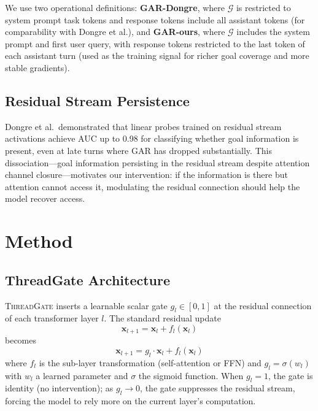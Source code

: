 \documentclass[11pt,a4paper]{article}
\newcommand{\gar}{\textsc{GAR}}
\newcommand{\tg}{\textsc{ThreadGate}}
\begin{document}
We use two operational definitions: \textbf{GAR-Dongre}, where $\mathcal{G}$ is restricted to system prompt task tokens and response tokens include all assistant tokens (for comparability with Dongre et al.), and \textbf{GAR-ours}, where $\mathcal{G}$ includes the system prompt and first user query, with response tokens restricted to the last token of each assistant turn (used as the training signal for richer goal coverage and more stable gradients).

\subsection{Residual Stream Persistence}

Dongre et al.\ demonstrated that linear probes trained on residual stream activations achieve AUC up to 0.98 for classifying whether goal information is present, even at late turns where \gar{} has dropped substantially.
This dissociation---goal information persisting in the residual stream despite attention channel closure---motivates our intervention: if the information is there but attention cannot access it, modulating the residual connection should help the model recover access.

\section{Method}
\label{sec:method}

\subsection{ThreadGate Architecture}

\tg{} inserts a learnable scalar gate $g_l \in [0, 1]$ at the residual connection of each transformer layer $l$.
The standard residual update
\begin{equation}
    \mathbf{x}_{l+1} = \mathbf{x}_l + f_l(\mathbf{x}_l)
\end{equation}
becomes
\begin{equation}
    \mathbf{x}_{l+1} = g_l \cdot \mathbf{x}_l + f_l(\mathbf{x}_l)
\end{equation}
where $f_l$ is the sub-layer transformation (self-attention or FFN) and $g_l = \sigma(w_l)$ with $w_l$ a learned parameter and $\sigma$ the sigmoid function.
When $g_l = 1$, the gate is identity (no intervention); as $g_l \to 0$, the gate suppresses the residual stream, forcing the model to rely more on the current layer's computation.
\end{document}
